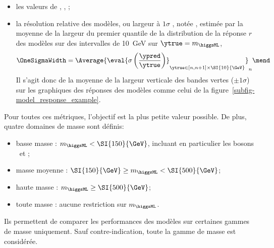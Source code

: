 \begin{itemize}
\item les valeurs de
\LossMSE,
\LossMAE,
\LossMAPE;
\item la résolution relative des modèles,
ou \og largeur à $1\sigma$ \fg,
notée \OneSigmaWidth,
estimée par
la moyenne
de
la largeur du premier quantile de la distribution de la réponse $r$ des modèles
sur des intervalles de \SI{10}{\GeV} sur $\ytrue=m_{\higgsML}$,
\ie
\begin{equation}
\OneSigmaWidth = \Average{\eval{\sigma\left(\frac{\ypred}{\ytrue}\right)}_{\ytrue\in [n, n+1]\times\SI{10}{\GeV}}}_n
\mend
\end{equation}
Il s'agit donc de la moyenne de la largeur verticale des bandes vertes ($\pm1\sigma$) sur les graphiques des réponses des modèles comme celui de la figure~\ref{subfig-model_response_example}.
\end{itemize}
Pour toutes ces métriques, l'objectif est la plus petite valeur possible.
De plus, quatre domaines de masse sont définis:
\begin{itemize}
\item basse masse : $m_{\higgsML} < \SI{150}{\GeV}$, incluant en particulier les bosons \Zboson\ et \higgs;
\item masse moyenne : $\SI{150}{\GeV} \geq m_{\higgsML} < \SI{500}{\GeV}$;
\item haute masse : $m_{\higgsML} \geq \SI{500}{\GeV}$;
\item toute masse : aucune restriction sur $m_{\higgsML}$.
\end{itemize}
Ils permettent de comparer les performances des modèles sur certaines gammes de masse uniquement.
Sauf contre-indication, toute la gamme de masse est considérée.
